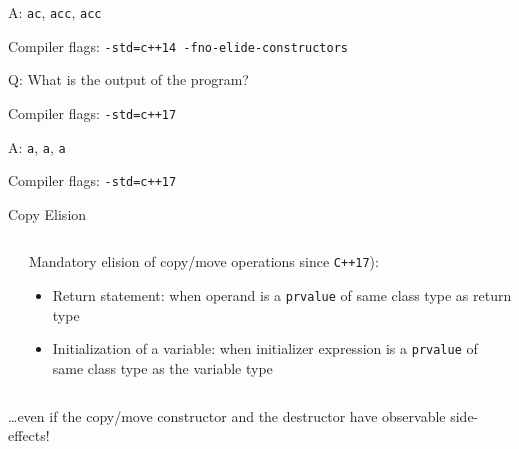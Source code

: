 \begin{frame}[fragile]{A: \texttt{ac}, \texttt{acc}, \texttt{acc}}
    \begin{center}
        Compiler flags: \texttt{-std=c++14 -fno-elide-constructors}
    \end{center}

\end{frame}

\begin{frame}[fragile]{Q: What is the output of the program?}
    \begin{center}
        Compiler flags: \texttt{-std=c++17}
    \end{center}

\end{frame}

\begin{frame}[fragile]{A: \texttt{a}, \texttt{a}, \texttt{a}}
    \begin{center}
        Compiler flags: \texttt{-std=c++17}
    \end{center}

\end{frame}

\begin{frame}
    \centering

\end{frame}

\begin{frame}{Copy Elision}
    \begin{columns}
        \begin{column}{.45\textwidth}
        \end{column}
        \begin{column}{.5\textwidth}
            Mandatory elision of copy/move operations since \texttt{C++17}):
            \begin{itemize}
                \item Return statement: when operand is a \texttt{prvalue} of same class type as return type
                \item Initialization of a variable: when initializer expression is a \texttt{prvalue} of same class type as the variable type
            \end{itemize}
        \end{column}
    \end{columns}
    \ldots even if the copy/move constructor and the destructor have observable side-effects!
    \vspace{.5cm}

    \centering
\end{frame}

